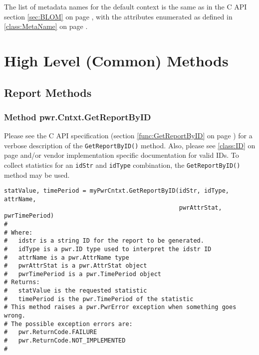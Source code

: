 \documentclass[12pt]{report} %
\begin{document}
\begin{appendices}
The list of metadata names for the default context is the same as in the C API
section \ref{sec:BLOM} on page \pageref{sec:BLOM}, with the attributes
enumerated as defined in \ref{class:MetaName} on page \pageref{class:MetaName}.

\section{High Level (Common) Methods}\label{sec:PythonHighLevelCommonMethods}
\subsection{Report Methods}\label{sec:PythonReportMethods}

\subsubsection{Method pwr.Cntxt.GetReportByID} \label{meth:GetReportByID}

Please see the C API specification (section \ref{func:GetReportByID} on page
\pageref{func:GetReportByID}) for a verbose description of the \texttt{GetReportByID()} method. Also, please see
\ref{class:ID} on page \pageref{class:ID} and/or vendor implementation specific
documentation for valid IDs. To collect statistics for an \texttt{idStr} and \texttt{idType} combination, the \texttt{GetReportByID()} method may be used. 

\begin{center}\begin{minipage}{.95\linewidth}\begin{lstlisting}
statValue, timePeriod = myPwrCntxt.GetReportByID(idStr, idType, attrName,
                                                 pwrAttrStat, pwrTimePeriod)
#
# Where:
#   idstr is a string ID for the report to be generated.
#   idType is a pwr.ID type used to interpret the idstr ID
#   attrName is a pwr.AttrName type
#   pwrAttrStat is a pwr.AttrStat object
#   pwrTimePeriod is a pwr.TimePeriod object
# Returns:
#   statValue is the requested statistic
#   timePeriod is the pwr.TimePeriod of the statistic
# This method raises a pwr.PwrError exception when something goes wrong.
# The possible exception errors are: 
#   pwr.ReturnCode.FAILURE
#   pwr.ReturnCode.NOT_IMPLEMENTED
#
\end{lstlisting}\end{minipage}\end{center}



\end{appendices}
\end{document}
